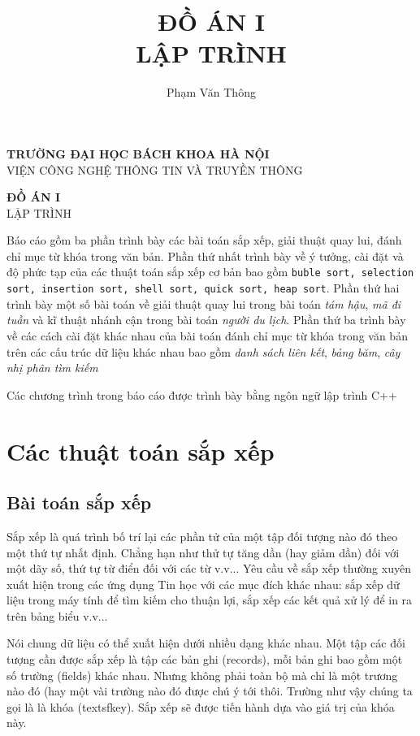 \documentclass[8pt, a4paper]{article}
\title{\textbf{\huge{ĐỒ ÁN I}}\\ \large{\textsc{LẬP TRÌNH}}}
\author{Phạm Văn Thông}
\date{}
\begin{document}
\begin{center}
\textbf{\Large{TRƯỜNG ĐẠI HỌC BÁCH KHOA HÀ NỘI}}\\
\textsc{VIỆN CÔNG NGHỆ THÔNG TIN VÀ TRUYỀN THÔNG}

\vspace{2cm}

\textbf{\Huge{ĐỒ ÁN I}} \\ \LARGE{\textsc{LẬP TRÌNH}}
\author{}
\end{center}

\newpage
\abstract
Báo cáo gồm ba phần trình bày các bài toán sắp xếp, giải thuật quay lui, đánh chỉ mục từ khóa trong văn bản. 
Phần thứ nhất trình bày về ý tưởng, cài đặt và độ phức tạp của các thuật toán sắp xếp cơ bản bao gồm \texttt{buble sort, selection sort, insertion sort, shell sort, quick sort, heap sort}. Phần thứ hai trình bày một số bài toán về giải thuật quay lui trong bài toán \emph{tám hậu}, \emph{mã đi tuần} và kĩ thuật nhánh cận trong bài toán \emph{người du lịch}. Phần thứ ba trình bày về các cách cài đặt khác nhau của bài toán đánh chỉ mục từ khóa trong văn bản trên các cấu trúc dữ liệu khác nhau bao gồm \emph{danh sách liên kết}, \emph{bảng băm}, \emph{cây nhị phân tìm kiếm}

Các chương trình trong báo cáo được trình bày bằng ngôn ngữ lập trình C++
\section{Các thuật toán sắp xếp}
\subsection{Bài toán sắp xếp}

Sắp xếp là quá trình bố trí lại các phần tử của một tập đối tượng nào đó theo một thứ tự nhất định. Chẳng hạn như thử tự tăng dần (hay giảm dần) đối với một dãy số, thứ tự từ điển đối với các từ v.v... Yêu cầu về sắp xếp thường xuyên xuất hiện trong các ứng dụng Tin học với các mục đích khác nhau: sắp xếp dữ liệu trong máy tính để tìm kiếm cho thuận lợi, sắp xếp các kết quả xử lý để in ra trên bảng biểu v.v...

Nói chung dữ liệu có thể xuất hiện dưới nhiều dạng khác nhau. Một tập các đối tượng cần được sắp xếp là tập các bản ghi (records), mỗi bản ghi bao gồm một số trường (fields) khác nhau. Nhưng không phải toàn bộ mà chỉ là một trương nào đó (hay một vài trường nào đó được chú ý tới thôi. Trường như vậy chúng ta gọi là là \textsf{khóa} (textsf{key}). Sắp xếp sẽ được tiến hành dựa vào giá trị của khóa này.\\
\end{document}
